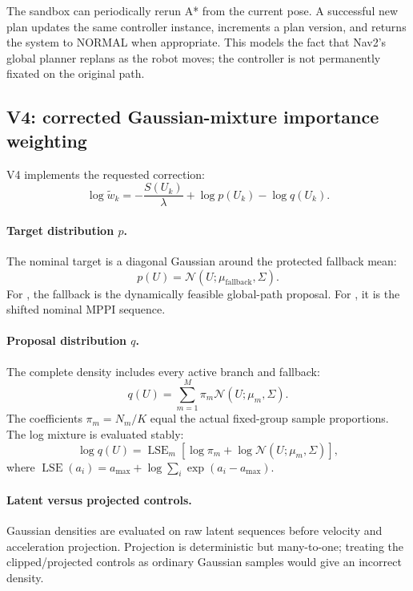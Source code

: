 \documentclass[11pt,a4paper]{article}
\newcommand{\code}[1]{\texttt{\detokenize{#1}}}
\newcommand{\Normal}{\mathcal{N}}
\begin{document}
The sandbox can periodically rerun A* from the current pose. A successful new
plan updates the same controller instance, increments a plan version, and
returns the system to NORMAL when appropriate. This models the fact that Nav2's
global planner replans as the robot moves; the controller is not permanently
fixated on the original path.

\subsection{V4: corrected Gaussian-mixture importance weighting}

V4 implements the requested correction:
\begin{equation}
  \log \widetilde{w}_k =
  -\frac{S(U_k)}{\lambda}
  + \log p(U_k)
  - \log q(U_k).
  \label{eq:v4weight}
\end{equation}

\paragraph{Target distribution $p$.}
The nominal target is a diagonal Gaussian around the protected fallback mean:
\begin{equation}
  p(U)=\Normal(U;\mu_{\mathrm{fallback}},\Sigma).
\end{equation}
For \code{hybrid}, the fallback is the dynamically feasible global-path
proposal. For \code{local}, it is the shifted nominal MPPI sequence.

\paragraph{Proposal distribution $q$.}
The complete density includes every active branch and fallback:
\begin{equation}
 q(U)=\sum_{m=1}^{M}\pi_m
 \Normal(U;\mu_m,\Sigma).
\end{equation}
The coefficients $\pi_m=N_m/K$ equal the actual fixed-group sample
proportions. The log mixture is evaluated stably:
\begin{equation}
 \log q(U)=\operatorname{LSE}_{m}
 \left[\log\pi_m+\log\Normal(U;\mu_m,\Sigma)\right],
\end{equation}
where $\operatorname{LSE}(a_i)=a_{\max}+
\log\sum_i\exp(a_i-a_{\max})$.

\paragraph{Latent versus projected controls.}
Gaussian densities are evaluated on raw latent sequences before velocity and
acceleration projection. Projection is deterministic but many-to-one; treating
the clipped/projected controls as ordinary Gaussian samples would give an
incorrect density.
\end{document}
